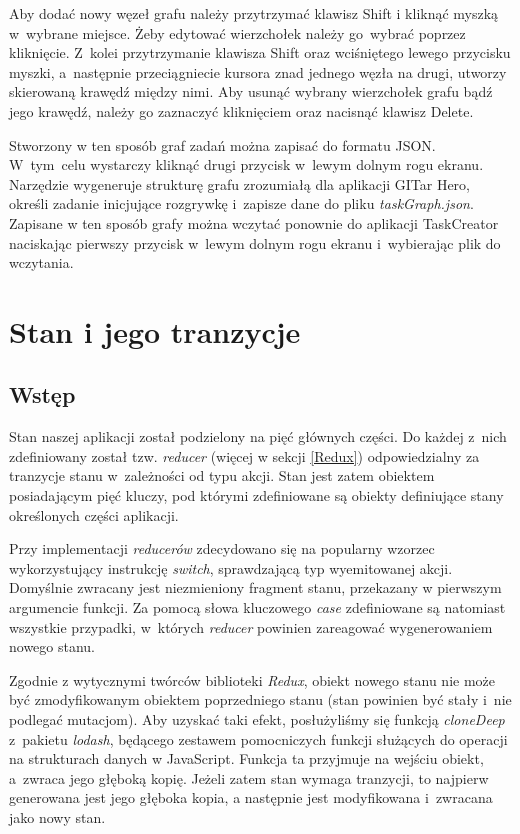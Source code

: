 \documentclass[12pt,a4paper,polish,thesis]{dcsbook}
\begin{document}
{	Aby dodać nowy węzeł grafu należy przytrzymać klawisz Shift i kliknąć myszką w~wybrane miejsce. Żeby edytować wierzchołek należy go~wybrać poprzez kliknięcie. Z~kolei przytrzymanie klawisza Shift oraz wciśniętego lewego przycisku myszki, a~następnie przeciągniecie kursora znad jednego węzła na drugi, utworzy skierowaną krawędź między nimi. Aby usunąć wybrany wierzchołek grafu bądź jego krawędź, należy go zaznaczyć kliknięciem oraz nacisnąć klawisz Delete.

	Stworzony w ten sposób graf zadań można zapisać do formatu JSON. W~tym~celu wystarczy kliknąć drugi przycisk w~lewym dolnym rogu ekranu. Narzędzie wygeneruje strukturę grafu zrozumiałą dla aplikacji GITar Hero, określi zadanie inicjujące rozgrywkę i~zapisze dane do pliku \textit{taskGraph.json}. Zapisane w ten sposób grafy można wczytać ponownie do aplikacji TaskCreator naciskając pierwszy przycisk w~lewym dolnym rogu ekranu i~wybierając plik do wczytania.
	
	\section{Stan i jego tranzycje}
	
	\subsection{Wstęp}
	
	Stan naszej aplikacji został podzielony na pięć głównych części. Do każdej z~nich zdefiniowany został tzw. \textit{reducer} (więcej w sekcji \ref{Redux}) odpowiedzialny za tranzycje stanu w~zależności od typu akcji. Stan jest zatem obiektem posiadającym pięć kluczy, pod którymi zdefiniowane są obiekty definiujące stany określonych części aplikacji.
	
	Przy implementacji \textit{reducerów} zdecydowano się na popularny wzorzec wykorzystujący instrukcję \textit{switch}, sprawdzającą typ wyemitowanej akcji. Domyślnie zwracany jest niezmieniony fragment stanu, przekazany w pierwszym argumencie funkcji. Za pomocą słowa kluczowego \textit{case} zdefiniowane są natomiast wszystkie przypadki, w~których \textit{reducer} powinien zareagować wygenerowaniem nowego stanu.
	
	Zgodnie z wytycznymi twórców biblioteki \textit{Redux}, obiekt nowego stanu nie może być zmodyfikowanym obiektem poprzedniego stanu (stan powinien być stały i~nie podlegać mutacjom). Aby uzyskać taki efekt, posłużyliśmy się funkcją \textit{cloneDeep} z~pakietu \textit{lodash}, będącego zestawem pomocniczych funkcji służących do operacji na strukturach danych w JavaScript. Funkcja ta przyjmuje na wejściu obiekt, a~zwraca jego głęboką kopię. Jeżeli zatem stan wymaga tranzycji, to najpierw generowana jest jego głęboka kopia, a następnie jest modyfikowana i~zwracana jako nowy stan.
	
}
\end{document}

